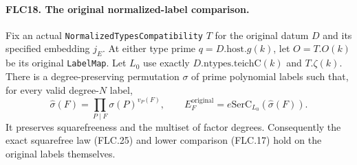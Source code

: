\paragraph{FLC18. The original normalized-label comparison.}
\label{claim:FLC18}
\mbox{}\par\noindent
Fix an actual \texttt{NormalizedTypesCompatibility} $T$ for
the original datum $D$ and its specified embedding $j_E$.
At either type prime $q=D.\mathrm{host}.g(k)$, let $O=T.O(k)$
be its original \texttt{LabelMap}.  Let $L_0$ use exactly
$D.\mathrm{ntypes}.\mathrm{teichC}(k)$ and $T.\zeta(k)$.
There is a degree-preserving permutation $\sigma$ of prime
polynomial labels such that, for every valid degree-$N$ label,
\[
 \widehat\sigma(F)=\prod_{P\mid F}\sigma(P)^{v_P(F)},\qquad
 E_F^{\mathrm{original}}=e\mathrm{SerC}_{L_0}(\widehat\sigma(F)).
 \tag{FLC.26}
\]
It preserves squarefreeness and the multiset of factor degrees.
Consequently the exact squarefree law (FLC.25) and lower
comparison (FLC.17) hold on the original labels themselves.
